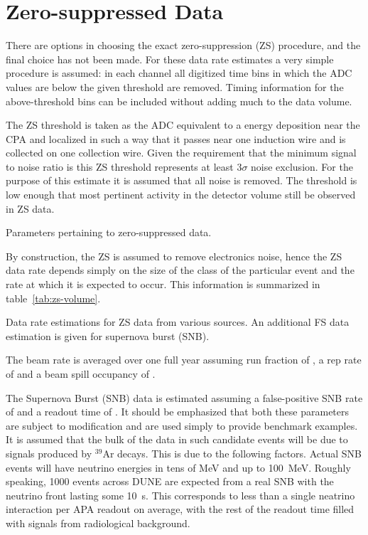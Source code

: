 \section{Zero-suppressed Data}

There are options in choosing the exact zero-suppression (ZS) procedure,
and the final choice has not been made.
For these data rate estimates a very simple procedure is assumed: in each
channel all digitized time bins in which the ADC values are below
the given threshold are removed. Timing information for the above-threshold bins can be included without
adding much to the data volume.

The ZS threshold is taken as the ADC equivalent to a
\chargezsthreshold
energy deposition near the CPA and localized in such a way that it passes near one
induction wire and is collected on one collection wire.
Given the requirement that the minimum signal to noise ratio is
\chargeminsignalnoiseratio this ZS threshold represents at least $3\sigma$
noise exclusion.
For the purpose of this estimate it is assumed that all noise is
removed.
The threshold is low enough that most pertinent activity in the
detector volume still be observed in ZS data.


\begin{table}[htbp]
  \centering
  \caption{Parameters pertaining to zero-suppressed data.}
  
  \label{tab:zs-parameters-table}
\end{table}

By construction, the ZS is assumed to remove electronics
noise, hence the ZS data rate depends simply on the size of the class of the particular event and
the rate at which it is expected to occur.
This information is summarized in table~\ref{tab:zs-volume}.


\begin{table}[htbp]
  \centering
  \caption{Data rate estimations for ZS data from various sources.
  An additional FS data estimation is given for supernova burst (SNB).}
  
  \label{tab:zs-volume}
\end{table}

The beam rate is averaged over one full year assuming run fraction of
\beamrunfraction, a rep rate of \beamreprate and a beam spill occupancy
of \beameventoccupancy.

The Supernova Burst (SNB) data is estimated assuming a false-positive SNB
rate of \snbrate and a readout time of \snbreadouttime.
It should be emphasized that both these parameters are subject to
modification and are used simply to provide benchmark examples.
It is assumed that the bulk of the data in such candidate events will be due to signals produced by $^{39}$Ar decays.
This is due to the following factors.
Actual SNB events will have neutrino energies in tens of MeV and up to
\SI{100}{\MeV}.
Roughly speaking, 1000 events across DUNE are expected from a real SNB
with the neutrino front lasting some \SI{10}{\second}. This corresponds to less
than a single neatrino interaction per APA readout on average, with the rest of the readout time
filled with signals from radiological background.

